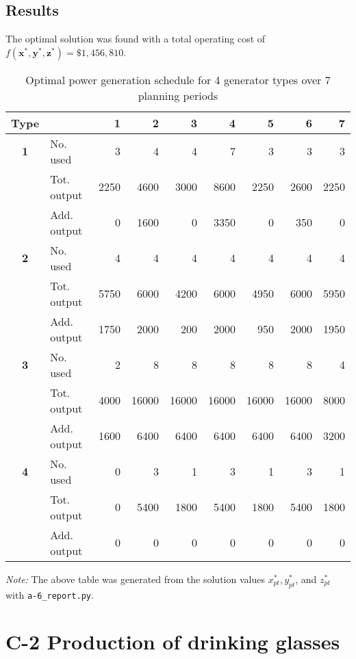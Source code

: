 \documentclass[8pt,oneside]{extarticle}
\newcommand{\vect}[1]{\boldsymbol{#1}}
\begin{document}
\subsection{Results}

The optimal solution was found with a total operating cost of
$f\left(\vect{x}^*, \vect{y}^*, \vect{z}^*\right) = \$1,456,810$.

\begin{table}[ht]
    \centering
    \caption{Optimal power generation schedule for 4 generator types over 7 planning periods}
\begin{tabular}{clrrrrrrr}
    \hline
    \textbf{Type} & & \textbf{1} & \textbf{2} & \textbf{3} & \textbf{4} & \textbf{5} & \textbf{6} & \textbf{7} \\
\hline
    \textbf{1} & No. used & 3 & 4 & 4 & 7 & 3 & 3 & 3\\
 & Tot. output & 2250 & 4600 & 3000 & 8600 & 2250 & 2600 & 2250\\
 & Add. output & 0 & 1600 & 0 & 3350 & 0 & 350 & 0\\
 \hline
    \textbf{2} & No. used & 4 & 4 & 4 & 4 & 4 & 4 & 4\\
 & Tot. output & 5750 & 6000 & 4200 & 6000 & 4950 & 6000 & 5950\\
 & Add. output & 1750 & 2000 & 200 & 2000 & 950 & 2000 & 1950\\
 \hline
    \textbf{3} & No. used & 2 & 8 & 8 & 8 & 8 & 8 & 4\\
 & Tot. output & 4000 & 16000 & 16000 & 16000 & 16000 & 16000 & 8000\\
 & Add. output & 1600 & 6400 & 6400 & 6400 & 6400 & 6400 & 3200\\
 \hline
    \textbf{4} & No. used & 0 & 3 & 1 & 3 & 1 & 3 & 1\\
 & Tot. output & 0 & 5400 & 1800 & 5400 & 1800 & 5400 & 1800\\
 & Add. output & 0 & 0 & 0 & 0 & 0 & 0 & 0\\
 \hline
\end{tabular}

\medskip
\emph{Note:} The above table was generated from the solution values $x_{pt}^*, 
y_{pt}^*$, and $z_{pt}^*$ with \texttt{a-6\_report.py}.
\end{table}

\section{C-2 Production of drinking glasses}
\end{document}
